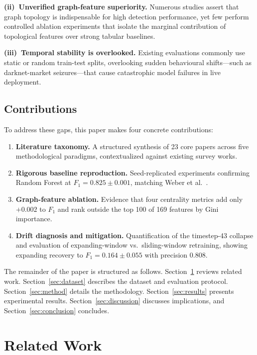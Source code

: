 \documentclass[conference]{IEEEtran}
\begin{document}
\smallskip
\noindent\textbf{(ii)~Unverified graph-feature superiority.}
Numerous studies assert that graph topology is indispensable for high
detection performance, yet few perform controlled ablation experiments
that isolate the marginal contribution of topological features over
strong tabular baselines.

\smallskip
\noindent\textbf{(iii)~Temporal stability is overlooked.}
Existing evaluations commonly use static or random train-test splits,
overlooking sudden behavioural shifts---such as darknet-market
seizures---that cause catastrophic model failures in live deployment.

\subsection{Contributions}

To address these gaps, this paper makes four concrete contributions:
\begin{enumerate}
  \item \textbf{Literature taxonomy.}
    A structured synthesis of 23 core papers across five methodological
    paradigms, contextualized against existing survey works.
  \item \textbf{Rigorous baseline reproduction.}
    Seed-replicated experiments confirming Random Forest at
    $F_1 = 0.825 \pm 0.001$, matching Weber et al.\ \cite{weber2019anti}.
  \item \textbf{Graph-feature ablation.}
    Evidence that four centrality metrics add only $+0.002$ to $F_1$ and
    rank outside the top 100 of 169 features by Gini importance.
  \item \textbf{Drift diagnosis and mitigation.}
    Quantification of the timestep-43 collapse and evaluation of
    expanding-window vs.\ sliding-window retraining, showing expanding
    recovery to $F_1 = 0.164 \pm 0.055$ with precision $0.808$.
\end{enumerate}

The remainder of the paper is structured as follows.
Section~\ref{sec:related} reviews related work.
Section~\ref{sec:dataset} describes the dataset and evaluation protocol.
Section~\ref{sec:method} details the methodology.
Section~\ref{sec:results} presents experimental results.
Section~\ref{sec:discussion} discusses implications, and
Section~\ref{sec:conclusion} concludes.

\section{Related Work}
\label{sec:related}
\end{document}
